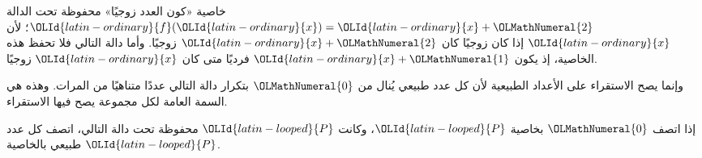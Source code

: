 \documentclass[../../../include/open-logic-section]{subfiles}
\begin{document}
\begin{explain}
خاصية «كون العدد زوجيًا» محفوظة تحت الدالة $\OLId{latin-ordinary}{f}(\OLId{latin-ordinary}{x}) = \OLId{latin-ordinary}{x}+\OLMathNumeral{2}$؛ لأن
$\OLId{latin-ordinary}{x}$ إذا كان زوجيًا كان $\OLId{latin-ordinary}{x}+\OLMathNumeral{2}$ زوجيًا. وأما دالة التالي فلا تحفظ هذه
الخاصية، إذ يكون $\OLId{latin-ordinary}{x}+\OLMathNumeral{1}$ فرديًا متى كان $\OLId{latin-ordinary}{x}$ زوجيًا.

وإنما يصح الاستقراء على الأعداد الطبيعية لأن كل عدد طبيعي يُنال من
$\OLMathNumeral{0}$ بتكرار دالة التالي عددًا متناهيًا من المرات. وهذه هي السمة العامة
لكل مجموعة يصح فيها الاستقراء.
\end{explain}

\begin{defn}
إذا اتصف $\OLMathNumeral{0}$ بخاصية $\OLId{latin-looped}{P}$، وكانت $\OLId{latin-looped}{P}$ محفوظة تحت دالة التالي، اتصف كل
عدد طبيعي بالخاصية $\OLId{latin-looped}{P}$.
\end{defn}
\end{document}

